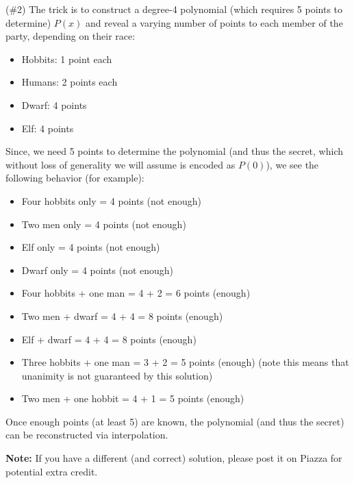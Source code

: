 \documentclass[]{article}
\renewcommand{\answer}[1]{{\color{mydarkblue}\textbf{}#1}}
\begin{document}
\begin{qunlist}
\begin{enumerate}
{{%




\answer (\#2) The trick is to construct a degree-4 polynomial (which requires 5 points to determine) $P(x)$ and reveal a varying number of points to each member of the party, depending on their race:

\begin{itemize}
	\item Hobbits: 1 point each
	\item Humans: 2 points each
	\item Dwarf: 4 points
	\item Elf: 4 points
\end{itemize}

Since, we need 5 points to determine the polynomial (and thus the secret, which without loss of generality we will assume is encoded as $P(0)$), we see the following behavior (for example):
\begin{itemize}
	\item Four hobbits only = 4 points (not enough)
	\item Two men only = 4 points (not enough)
	\item Elf only = 4 points (not enough)
	\item Dwarf only = 4 points (not enough)
	\item Four hobbits + one man = 4 + 2 = 6 points (enough)
	\item Two men + dwarf = 4 + 4 = 8 points (enough)
	\item Elf + dwarf = 4 + 4 = 8 points (enough)
	\item Three hobbits + one man = 3 + 2 = 5 points (enough) (note this means that unanimity is not guaranteed by this solution)
	\item Two men + one hobbit = 4 + 1 = 5 points (enough)
\end{itemize}

Once enough points (at least 5) are known, the polynomial (and thus the secret) can be reconstructed via interpolation.

\textbf{Note:} If you have a different (and correct) solution, please post it on Piazza for potential extra credit.

}}
\end{enumerate}
\end{qunlist}
\end{document}
